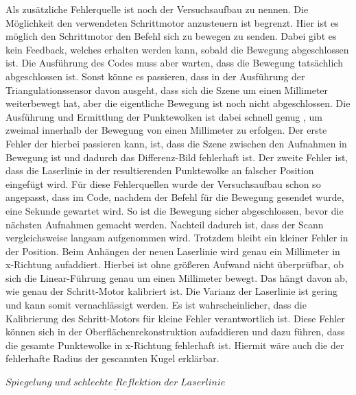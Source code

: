 		Als zusätzliche Fehlerquelle ist noch der Versuchsaufbau zu nennen. Die Möglichkeit den verwendeten Schrittmotor anzusteuern ist begrenzt. Hier ist es möglich den Schrittmotor den Befehl sich zu bewegen zu senden. Dabei gibt es kein Feedback, welches erhalten werden kann, sobald die Bewegung abgeschlossen ist. Die Ausführung des Codes muss aber warten, dass die Bewegung tatsächlich abgeschlossen ist. Sonst könne es passieren, dass in der Ausführung der Triangulationssensor davon ausgeht, dass sich die Szene um einen Millimeter weiterbewegt hat, aber die eigentliche Bewegung ist noch nicht abgeschlossen. Die Ausführung und Ermittlung der Punktewolken ist dabei schnell genug , um zweimal innerhalb der Bewegung von einen Millimeter zu erfolgen. Der erste Fehler der hierbei passieren kann, ist, dass die Szene zwischen den Aufnahmen in Bewegung ist und dadurch das Differenz-Bild fehlerhaft ist. Der zweite Fehler ist, dass die Laserlinie in der resultierenden Punktewolke an falscher Position eingefügt wird. Für diese Fehlerquellen wurde der Versuchsaufbau schon so angepasst, dass im Code, nachdem der Befehl für die Bewegung gesendet wurde, eine Sekunde gewartet wird. So ist die Bewegung sicher abgeschlossen, bevor die nächsten Aufnahmen gemacht werden. Nachteil dadurch ist, dass der Scann vergleichsweise langsam aufgenommen wird. Trotzdem bleibt ein kleiner Fehler in der Position. Beim Anhängen der neuen Laserlinie wird genau ein Millimeter in x-Richtung aufaddiert. Hierbei ist ohne größeren Aufwand nicht überprüfbar, ob sich die Linear-Führung genau um einen Millimeter bewegt. Das hängt davon ab, wie genau der Schritt-Motor kalibriert ist. Die Varianz der Laserlinie ist gering und kann somit vernachlässigt werden. Es ist wahrscheinlicher, dass die Kalibrierung des Schritt-Motors für kleine Fehler verantwortlich ist. Diese Fehler können sich in der Oberflächenrekonstruktion aufaddieren und dazu führen, dass die gesamte Punktewolke in x-Richtung fehlerhaft ist. Hiermit wäre auch die der fehlerhafte Radius der gescannten Kugel erklärbar.
		
		$\underline{Spiegelung \; und \; schlechte \; Reflektion \; der \; Laserlinie}$
		
		